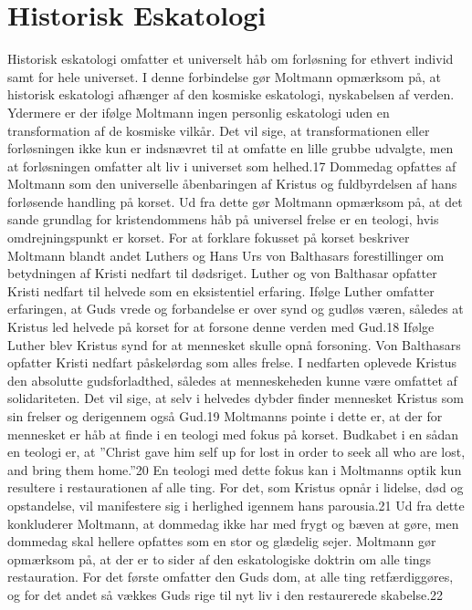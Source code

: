 \section{Historisk Eskatologi} 
Historisk eskatologi omfatter et universelt håb om forløsning for ethvert individ samt for hele universet. I denne forbindelse gør Moltmann opmærksom på, at historisk eskatologi afhænger af den kosmiske eskatologi, nyskabelsen af verden. Ydermere er der ifølge Moltmann ingen personlig eskatologi uden en transformation af de kosmiske vilkår. Det vil sige, at transformationen eller forløsningen ikke kun er indsnævret til at omfatte en lille grubbe udvalgte, men at forløsningen omfatter alt liv i universet som helhed.17 Dommedag opfattes af Moltmann som den universelle åbenbaringen af Kristus og fuldbyrdelsen af hans forløsende handling på korset. Ud fra dette gør Moltmann opmærksom på, at det sande grundlag for kristendommens håb på universel frelse er en teologi, hvis omdrejningspunkt er korset. For at forklare fokusset på korset beskriver Moltmann blandt andet Luthers og Hans Urs von Balthasars forestillinger om betydningen af Kristi nedfart til dødsriget. Luther og von Balthasar opfatter Kristi nedfart til helvede som en eksistentiel erfaring. Ifølge Luther omfatter erfaringen, at Guds vrede og forbandelse er over synd og gudløs væren, således at Kristus led helvede på korset for at forsone denne verden med Gud.18 Ifølge Luther blev Kristus synd for at mennesket skulle opnå forsoning. Von Balthasars opfatter Kristi nedfart påskelørdag som alles frelse. I nedfarten oplevede Kristus den absolutte gudsforladthed, således at menneskeheden kunne være omfattet af solidariteten. Det vil sige, at selv i helvedes dybder finder mennesket Kristus som sin frelser og derigennem også Gud.19 Moltmanns pointe i dette er, at der for mennesket er håb at finde i en teologi med fokus på korset. Budkabet i en sådan en teologi er, at ”Christ gave him self up for lost in order to seek all who are lost, and bring them home.”20 En teologi med dette fokus kan i Moltmanns optik kun resultere i restaurationen af alle ting. For det, som Kristus opnår i lidelse, død og opstandelse, vil manifestere sig i herlighed igennem hans parousia.21 Ud fra dette konkluderer Moltmann, at dommedag ikke har med frygt og bæven at gøre, men dommedag skal hellere opfattes som en stor og glædelig sejer. Moltmann gør opmærksom på, at der er to sider af den eskatologiske doktrin om alle tings restauration. For det første omfatter den Guds dom, at alle ting retfærdiggøres, og for det andet så vækkes Guds rige til nyt liv i den restaurerede skabelse.22